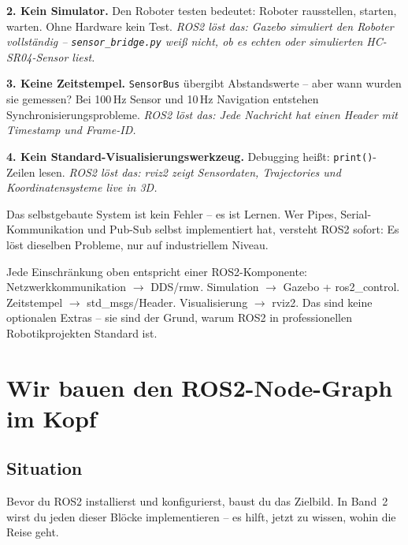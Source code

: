 \textbf{2. Kein Simulator.}
Den Roboter testen bedeutet: Roboter rausstellen, starten,
warten. Ohne Hardware kein Test.
\emph{ROS2 löst das: Gazebo simuliert den Roboter vollständig --
\texttt{sensor\_bridge.py} weiß nicht, ob es echten oder
simulierten HC-SR04-Sensor liest.}

\textbf{3. Keine Zeitstempel.}
\texttt{SensorBus} übergibt Abstandswerte -- aber wann wurden
sie gemessen? Bei 100\,Hz Sensor und 10\,Hz Navigation
entstehen Synchronisierungsprobleme.
\emph{ROS2 löst das: Jede Nachricht hat einen Header mit Timestamp
und Frame-ID.}

\textbf{4. Kein Standard-Visualisierungswerkzeug.}
Debugging heißt: \texttt{print()}-Zeilen lesen.
\emph{ROS2 löst das: rviz2 zeigt Sensordaten, Trajectories
und Koordinatensysteme live in 3D.}

\begin{merksatzBox}
Das selbstgebaute System ist kein Fehler -- es ist Lernen.
Wer Pipes, Serial-Kommunikation und Pub-Sub selbst
implementiert hat, versteht ROS2 sofort: Es löst dieselben
Probleme, nur auf industriellem Niveau.
\end{merksatzBox}

\begin{robotikBox}
Jede Einschränkung oben entspricht einer ROS2-Komponente:
Netzwerkkommunikation $\to$ DDS/rmw.
Simulation $\to$ Gazebo + ros2\_control.
Zeitstempel $\to$ std\_msgs/Header.
Visualisierung $\to$ rviz2.
Das sind keine optionalen Extras -- sie sind der Grund,
warum ROS2 in professionellen Robotikprojekten Standard ist.
\end{robotikBox}

\chapter{Wir bauen den ROS2-Node-Graph im Kopf}

\kapitelstruktur

\section{Situation}

Bevor du ROS2 installierst und konfigurierst, baust du
das Zielbild. In Band~2 wirst du jeden dieser Blöcke
implementieren -- es hilft, jetzt zu wissen, wohin die Reise geht.

